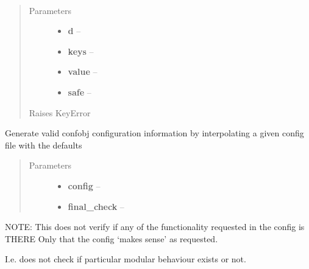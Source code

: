 \documentclass[letterpaper,10pt,english]{sphinxmanual}
\begin{document}
\begin{fulllineitems}
\label{index:aietes.Tools.update_dict}~\begin{quote}\begin{description}
\item[{Parameters}] \leavevmode\begin{itemize}
\item {} 
\textbf{d} -- 

\item {} 
\textbf{keys} -- 

\item {} 
\textbf{value} -- 

\item {} 
\textbf{safe} -- 

\end{itemize}

\item[{Raises KeyError}] \leavevmode


\end{description}\end{quote}

\end{fulllineitems}


\begin{fulllineitems}
\label{index:aietes.Tools.validate_config}
Generate valid confobj configuration information by interpolating a given config
file with the defaults
\begin{quote}\begin{description}
\item[{Parameters}] \leavevmode\begin{itemize}
\item {} 
\textbf{config} -- 

\item {} 
\textbf{final\_check} -- 

\end{itemize}

\end{description}\end{quote}

NOTE: This does not verify if any of the functionality requested in the config is THERE
Only that the config `makes sense' as requested.

I.e. does not check if particular modular behaviour exists or not.

\end{fulllineitems}
\end{document}
